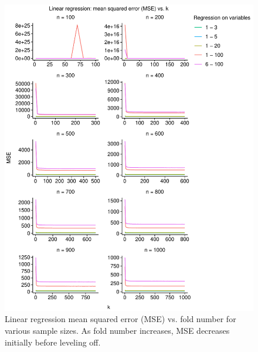 \documentclass[
  12pt,
]{article}
\begin{document}
\begin{figure}[H]

{\centering \includegraphics{manuscript_files/figure-latex/unnamed-chunk-3-1} 

}

\caption{Linear regression mean squared error (MSE) vs. fold number for various sample sizes. As fold number increases, MSE decreases initially before leveling off.}\label{fig:unnamed-chunk-3}
\end{figure}
\end{document}
